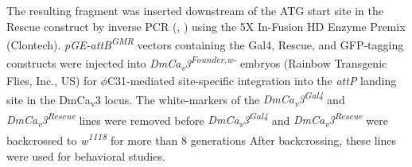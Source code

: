 The resulting fragment was inserted downstream of the ATG start site in the Rescue construct by inverse PCR (, ) using the 5X In-Fusion HD Enzyme Premix (Clontech).       
\emph{pGE-attB\textsuperscript{GMR}} vectors containing the Gal4, Rescue, and GFP-tagging constructs were injected into \emph{DmCa\textsubscript{v}3\textsuperscript{Founder,w-}} embryos (Rainbow Transgenic Flies, Inc., US) for $\phi$C31-mediated site-specific integration into the \emph{attP} landing site in the DmCa\textsubscript{v}3 locus.
The white-markers of the \emph{DmCa\textsubscript{v}3\textsuperscript{Gal4}} and \emph{DmCa\textsubscript{v}3\textsuperscript{Rescue}} lines were removed before \emph{DmCa\textsubscript{v}3\textsuperscript{Gal4}} and \emph{DmCa\textsubscript{v}3\textsuperscript{Rescue}} were backcrossed to \emph{w\textsuperscript{1118}} for more than 8 generations
After backcrossing, these lines were used for behavioral studies.
